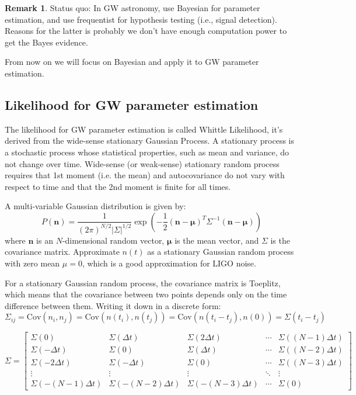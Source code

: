 \documentclass[12pt, a4paper]{article}
\newcounter{lecture}              %
\theoremstyle{plain} %
\theoremstyle{definition} %
\newtheorem{remark}{Remark}[lecture]
\begin{document}
\begin{remark}
    Status quo: In GW astronomy, use Bayesian for parameter estimation, and use frequentist for hypothesis testing (i.e., signal detection). Reasons for the latter is probably we don't have enough computation power to get the Bayes evidence.
\end{remark}

From now on we will focus on Bayesian and apply it to GW parameter estimation.

\subsection*{Likelihood for GW parameter estimation}

The likelihood for GW parameter estimation is called Whittle Likelihood, it's derived from the wide-sense stationary Gaussian Process. A stationary process is a stochastic process whose statistical properties, such as mean and variance, do not change over time. Wide-sense (or weak-sense) stationary random process requires that 1st moment (i.e. the mean) and autocovariance do not vary with respect to time and that the 2nd moment is finite for all times.

A multi-variable Gaussian distribution is given by:
\begin{equation}
    P(\mathbf{n}) = \frac{1}{(2\pi)^{N/2} |\Sigma|^{1/2}} \exp\left(-\frac{1}{2} (\mathbf{n}-\boldsymbol{\mu})^T \Sigma^{-1} (\mathbf{n}-\boldsymbol{\mu})\right)
\end{equation}
where $\mathbf{n}$ is an $N$-dimensional random vector, $\boldsymbol{\mu}$ is the mean vector, and $\Sigma$ is the covariance matrix. Approximate $n(t)$ as a stationary Gaussian random process with zero mean $\mu=0$, which is a good approximation for LIGO noise. 

For a stationary Gaussian random process, the covariance matrix is Toeplitz, which means that the covariance between two points depends only on the time difference between them. Writing it down in a discrete form:
\begin{equation}
    \Sigma_{ij} = \mathrm{Cov}(n_i, n_j) = \mathrm{Cov}(n(t_i), n(t_j)) = \mathrm{Cov}(n(t_i - t_j), n(0)) = \Sigma(t_i - t_j)
\end{equation}

\begin{equation}
    \Sigma = \begin{bmatrix}
        \Sigma(0) & \Sigma(\Delta t) & \Sigma(2\Delta t) & \cdots & \Sigma((N-1)\Delta t) \\
        \Sigma(-\Delta t) & \Sigma(0) & \Sigma(\Delta t) & \cdots & \Sigma((N-2)\Delta t) \\
        \Sigma(-2\Delta t) & \Sigma(-\Delta t) & \Sigma(0) & \cdots & \Sigma((N-3)\Delta t) \\
        \vdots & \vdots & \vdots & \ddots & \vdots \\
        \Sigma(-(N-1)\Delta t) & \Sigma(-(N-2)\Delta t) & \Sigma(-(N-3)\Delta t) & \cdots & \Sigma(0)
    \end{bmatrix}
\end{equation}
\end{document}
